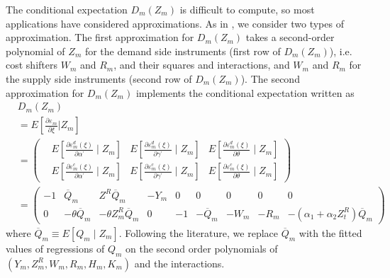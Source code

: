 \documentclass[11pt, a4paper]{article}
\begin{document}
The conditional expectation $D_{m}(Z_{m})$ is difficult to compute, so most applications have considered approximations. As in \cite{reynaert2014improving}, we consider two types of approximation. 
The first approximation for $D_{m}(Z_{m})$ takes a second-order polynomial of $Z_{m}$ for the demand side instruments (first row of $D_{m}(Z_{m})$), i.e. cost shifters $W_{m}$ and $R_{m}$, and their squares and interactions, and $W_{m}$ and $R_{m}$ for the supply side instruments (second row of $D_{m}(Z_{m})$).
The second approximation for $D_{m}(Z_{m})$ implements the conditional expectation written as 
\begin{align*}
    &D_{m}(Z_{m})\\
    &=E\left[\frac{\partial \varepsilon_{m}}{\partial \xi}| Z_{m}\right]\\
    &=
    \begin{pmatrix}
    & E\left[\frac{\partial \varepsilon_{m}^{d}(\xi)}{\partial \alpha^{\prime}} \mid Z_{m}\right] & 
    E\left[\frac{\partial \varepsilon_{m}^{d}(\xi)}{\partial \gamma^{\prime}} \mid Z_{m}\right] & 
    E\left[\frac{\partial \varepsilon_{m}^{d}(\xi)}{\partial \theta} \mid Z_{m}\right]\\
    & E\left[\frac{\partial \varepsilon_{m}^{c}(\xi)}{\partial \alpha^{\prime}} \mid Z_{m}\right] & 
    E\left[\frac{\partial \varepsilon_{m}^{c}(\xi)}{\partial \gamma^{\prime}} \mid Z_{m}\right] & 
    E\left[\frac{\partial \varepsilon_{m}^{c}(\xi)}{\partial \theta} \mid Z_{m}\right]
    \end{pmatrix} \\
    &=\begin{pmatrix}
    -1 & 
    \overline{Q}_{m} & 
    Z^{R} \overline{Q}_{m} & 
    - Y_{m} &
    0 & 0 & 0 & 0 & 0 \\
    0 &- \theta \overline{Q}_{m} & -\theta Z^{R}_{m}\overline{Q}_{m} & 0 & 
    -1 &
    - \overline{Q}_{m} &
    -W_{m} &
    -R_{m} &
    -(\alpha_1 + \alpha_2 Z^{R}_{t})\overline{Q}_{m}
    \end{pmatrix}
\end{align*}
where $ \overline{Q}_{m} \equiv E[Q_{m}\mid Z_{m}]$. Following the literature, we replace $ \overline{Q}_{m}$ with the fitted values of regressions of $Q_{m}$ on the second order polynomials of $(Y_m, Z_{m}^{R}, W_m, R_m, H_m, K_m)$ and the interactions.
\end{document}

